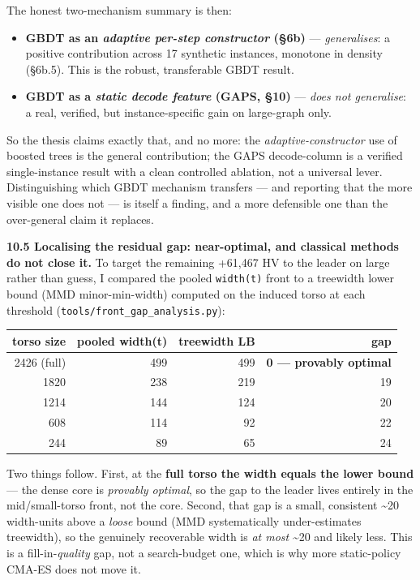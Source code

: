\documentclass[
  11pt,
]{article}
\providecommand{\tightlist}{%
  \setlength{\itemsep}{0pt}\setlength{\parskip}{0pt}}
\begin{document}
The honest two-mechanism summary is then:

\begin{itemize}
\tightlist
\item
  \textbf{GBDT as an \emph{adaptive per-step constructor} (§6b)} ---
  \emph{generalises}: a positive contribution across 17 synthetic
  instances, monotone in density (§6b.5). This is the robust,
  transferable GBDT result.
\item
  \textbf{GBDT as a \emph{static decode feature} (GAPS, §10)} ---
  \emph{does not generalise}: a real, verified, but instance-specific
  gain on large-graph only.
\end{itemize}

So the thesis claims exactly that, and no more: the
\emph{adaptive-constructor} use of boosted trees is the general
contribution; the GAPS decode-column is a verified single-instance
result with a clean controlled ablation, not a universal lever.
Distinguishing which GBDT mechanism transfers --- and reporting that the
more visible one does not --- is itself a finding, and a more defensible
one than the over-general claim it replaces.

\textbf{10.5 Localising the residual gap: near-optimal, and classical
methods do not close it.} To target the remaining +61,467 HV to the
leader on large rather than guess, I compared the pooled
\texttt{width(t)} front to a treewidth lower bound (MMD minor-min-width)
computed on the induced torso at each threshold
(\texttt{tools/front\_gap\_analysis.py}):

\begin{longtable}[]{@{}rrrr@{}}
\toprule
torso size & pooled width(t) & treewidth LB & gap\tabularnewline
\midrule
\endhead
2426 (full) & 499 & 499 & \textbf{0 --- provably optimal}\tabularnewline
1820 & 238 & 219 & 19\tabularnewline
1214 & 144 & 124 & 20\tabularnewline
608 & 114 & 92 & 22\tabularnewline
244 & 89 & 65 & 24\tabularnewline
\bottomrule
\end{longtable}

Two things follow. First, at the \textbf{full torso the width equals the
lower bound} --- the dense core is \emph{provably optimal}, so the gap
to the leader lives entirely in the mid/small-torso front, not the core.
Second, that gap is a small, consistent \textasciitilde20 width-units
above a \emph{loose} bound (MMD systematically under-estimates
treewidth), so the genuinely recoverable width is \emph{at most}
\textasciitilde20 and likely less. This is a fill-in-\emph{quality} gap,
not a search-budget one, which is why more static-policy CMA-ES does not
move it.
\end{document}
